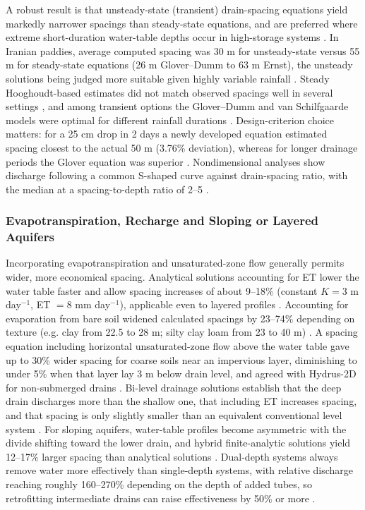 A robust result is that unsteady-state (transient) drain-spacing equations yield markedly narrower spacings than steady-state equations, and are preferred where extreme short-duration water-table depths occur in high-storage systems \parencite{OOSTERBAAN1988}. In Iranian paddies, average computed spacing was 30 m for unsteady-state versus 55 m for steady-state equations (26 m Glover--Dumm to 63 m Ernst), the unsteady solutions being judged more suitable given highly variable rainfall \parencite{DarziNaftchally2014}. Steady Hooghoudt-based estimates did not match observed spacings well in several settings \parencite{Moshayedi2020}, and among transient options the Glover--Dumm and van Schilfgaarde models were optimal for different rainfall durations \parencite{Moshayedi2020}. Design-criterion choice matters: for a 25 cm drop in 2 days a newly developed equation estimated spacing closest to the actual 50 m (3.76\% deviation), whereas for longer drainage periods the Glover equation was superior \parencite{Pali2014}. Nondimensional analyses show discharge following a common S-shaped curve against drain-spacing ratio, with the median at a spacing-to-depth ratio of 2--5 \parencite{Nédélec2010}.

\subsubsection{Evapotranspiration, Recharge and Sloping or Layered Aquifers}

Incorporating evapotranspiration and unsaturated-zone flow generally permits wider, more economical spacing. Analytical solutions accounting for ET lower the water table faster and allow spacing increases of about 9--18\% (constant $K=3$ m day$^{-1}$, ET $=8$ mm day$^{-1}$), applicable even to layered profiles \parencite{NIKAM1992,Singh2010,Upadhyaya2000}. Accounting for evaporation from bare soil widened calculated spacings by 23--74\% depending on texture (e.g. clay from 22.5 to 28 m; silty clay loam from 23 to 40 m) \parencite{AbdelFattah2005}. A spacing equation including horizontal unsaturated-zone flow above the water table gave up to 30\% wider spacing for coarse soils near an impervious layer, diminishing to under 5\% when that layer lay 3 m below drain level, and agreed with Hydrus-2D for non-submerged drains \parencite{Yousfi2014}. Bi-level drainage solutions establish that the deep drain discharges more than the shallow one, that including ET increases spacing, and that spacing is only slightly smaller than an equivalent conventional level system \parencite{Verma1998,Upadhyaya2000,Kankarej2023}. For sloping aquifers, water-table profiles become asymmetric with the divide shifting toward the lower drain, and hybrid finite-analytic solutions yield 12--17\% larger spacing than analytical solutions \parencite{Singh2010,Upadhyaya2013,Hartani2001}. Dual-depth systems always remove water more effectively than single-depth systems, with relative discharge reaching roughly 160--270\% depending on the depth of added tubes, so retrofitting intermediate drains can raise effectiveness by 50\% or more \parencite{Kirkham1997}.

